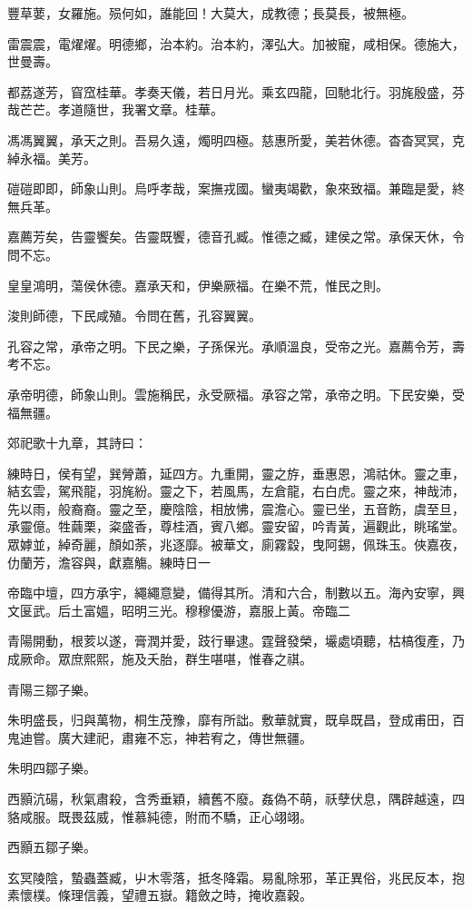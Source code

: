 \begin{pinyinscope}
豐草葽，女羅施。殒何如，誰能回！大莫大，成教德；長莫長，被無極。

雷震震，電燿燿。明德鄉，治本約。治本約，澤弘大。加被寵，咸相保。德施大，世曼壽。

都荔遂芳，窅窊桂華。孝奏天儀，若日月光。乘玄四龍，回馳北行。羽旄殷盛，芬哉芒芒。孝道隨世，我署文章。桂華。

馮馮翼翼，承天之則。吾易久遠，燭明四極。慈惠所愛，美若休德。杳杳冥冥，克綽永福。美芳。

磑磑即即，師象山則。烏呼孝哉，案撫戎國。蠻夷竭歡，象來致福。兼臨是愛，終無兵革。

嘉薦芳矣，告靈饗矣。告靈既饗，德音孔臧。惟德之臧，建侯之常。承保天休，令問不忘。

皇皇鴻明，蕩侯休德。嘉承天和，伊樂厥福。在樂不荒，惟民之則。

浚則師德，下民咸殖。令問在舊，孔容翼翼。

孔容之常，承帝之明。下民之樂，子孫保光。承順溫良，受帝之光。嘉薦令芳，壽考不忘。

承帝明德，師象山則。雲施稱民，永受厥福。承容之常，承帝之明。下民安樂，受福無疆。

郊祀歌十九章，其詩曰：

練時日，侯有望，巽膋蕭，延四方。九重開，靈之斿，垂惠恩，鴻祜休。靈之車，結玄雲，駕飛龍，羽旄紛。靈之下，若風馬，左倉龍，右白虎。靈之來，神哉沛，先以雨，般裔裔。靈之至，慶陰陰，相放怫，震澹心。靈已坐，五音飭，虞至旦，承靈億。牲繭栗，粢盛香，尊桂酒，賓八鄉。靈安留，吟青黃，遍觀此，眺瑤堂。眾嫭並，綽奇麗，顏如荼，兆逐靡。被華文，廁霧縠，曳阿錫，佩珠玉。俠嘉夜，仂蘭芳，澹容與，獻嘉觴。練時日一

帝臨中壇，四方承宇，繩繩意變，備得其所。清和六合，制數以五。海內安寧，興文匽武。后土富媼，昭明三光。穆穆優游，嘉服上黃。帝臨二

青陽開動，根荄以遂，膏潤并愛，跂行畢逮。霆聲發榮，壧處頃聽，枯槁復產，乃成厥命。眾庶熙熙，施及夭胎，群生啿啿，惟春之祺。

青陽三鄒子樂。

朱明盛長，归與萬物，桐生茂豫，靡有所詘。敷華就實，既阜既昌，登成甫田，百鬼迪嘗。廣大建祀，肅雍不忘，神若宥之，傳世無疆。

朱明四鄒子樂。

西顥沆碭，秋氣肅殺，含秀垂穎，續舊不廢。姦偽不萌，祅孽伏息，隅辟越遠，四貉咸服。既畏茲威，惟慕純德，附而不驕，正心翊翊。

西顥五鄒子樂。

玄冥陵陰，蟄蟲蓋臧，屮木零落，抵冬降霜。易亂除邪，革正異俗，兆民反本，抱素懷樸。條理信義，望禮五嶽。籍斂之時，掩收嘉穀。


\end{pinyinscope}
